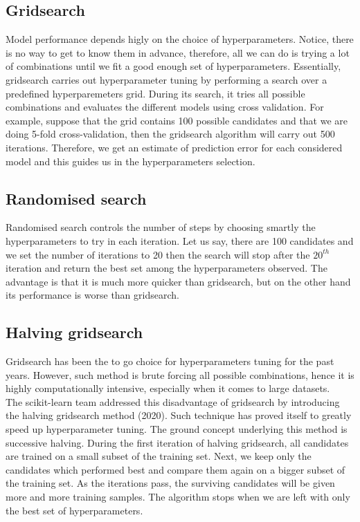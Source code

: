 \subsection{Gridsearch}
Model performance depends higly on the choice of hyperparameters. Notice, there is no way to get to know them in advance, therefore, all we can do is trying a lot of combinations until we fit a good enough set of hyperparameters. Essentially, gridsearch carries out hyperparameter tuning by performing a search over a predefined hyperparemeters grid. During its search, it tries all possible combinations and evaluates the different models %
using cross validation. For example, suppose that the grid contains 100 possible candidates and that we are doing 5-fold cross-validation, then the gridsearch algorithm will carry out 500 iterations.
Therefore, we get an estimate of prediction error for each considered model and this guides us in the hyperparameters selection.

\subsection{Randomised search}
Randomised search controls the number of steps by choosing smartly the hyperparameters to try in each iteration.
Let us say, there are 100 candidates and we set the number of iterations to 20 then the search will stop after the $20^{th}$ iteration and return the best set among the hyperparameters observed.
The advantage is that it is much more quicker than gridsearch, but on the other hand its performance is worse than gridsearch.

\subsection{Halving gridsearch}
Gridsearch has been the to go choice for hyperparameters tuning for the past years. However, such method is brute forcing all possible combinations, hence it is highly computationally intensive, especially when it comes to large datasets.
\\
The scikit-learn team addressed this disadvantage of gridsearch by introducing the halving gridsearch method  (2020). Such technique has proved itself to greatly speed up hyperparameter tuning.
The ground concept underlying this method is successive halving. During the first iteration of halving gridsearch, all candidates are trained on a small subset of the training set. Next, we keep only the candidates which performed best and compare  them again on a bigger subset of the training set. As the iterations pass, the surviving candidates will be given more and more training samples. The algorithm stops when we are left with only the best set of hyperparameters.

